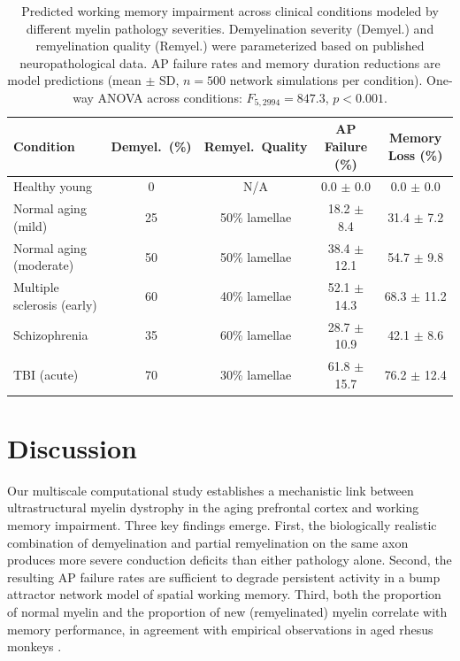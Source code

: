 \documentclass[11pt]{article}
\begin{document}
\begin{table}[H]
\centering
\caption{Predicted working memory impairment across clinical conditions modeled by different myelin pathology severities. Demyelination severity (Demyel.) and remyelination quality (Remyel.) were parameterized based on published neuropathological data. AP failure rates and memory duration reductions are model predictions (mean $\pm$ SD, $n = 500$ network simulations per condition). One-way ANOVA across conditions: $F_{5,2994} = 847.3$, $p < 0.001$.}
\label{tab:clinical}
\begin{tabular}{lcccc}
\toprule
\textbf{Condition} & \textbf{Demyel.\ (\%)} & \textbf{Remyel.\ Quality} & \textbf{AP Failure (\%)} & \textbf{Memory Loss (\%)} \\
\midrule
Healthy young & 0 & N/A & 0.0 $\pm$ 0.0 & 0.0 $\pm$ 0.0 \\
Normal aging (mild) & 25 & 50\% lamellae & 18.2 $\pm$ 8.4 & 31.4 $\pm$ 7.2 \\
Normal aging (moderate) & 50 & 50\% lamellae & 38.4 $\pm$ 12.1 & 54.7 $\pm$ 9.8 \\
Multiple sclerosis (early) & 60 & 40\% lamellae & 52.1 $\pm$ 14.3 & 68.3 $\pm$ 11.2 \\
Schizophrenia & 35 & 60\% lamellae & 28.7 $\pm$ 10.9 & 42.1 $\pm$ 8.6 \\
TBI (acute) & 70 & 30\% lamellae & 61.8 $\pm$ 15.7 & 76.2 $\pm$ 12.4 \\
\bottomrule
\end{tabular}
\end{table}

\section{Discussion}

Our multiscale computational study establishes a mechanistic link between ultrastructural myelin dystrophy in the aging prefrontal cortex and working memory impairment. Three key findings emerge. First, the biologically realistic combination of demyelination and partial remyelination on the same axon produces more severe conduction deficits than either pathology alone. Second, the resulting AP failure rates are sufficient to degrade persistent activity in a bump attractor network model of spatial working memory. Third, both the proportion of normal myelin and the proportion of new (remyelinated) myelin correlate with memory performance, in agreement with empirical observations in aged rhesus monkeys \citep{peters2009}.
\end{document}
